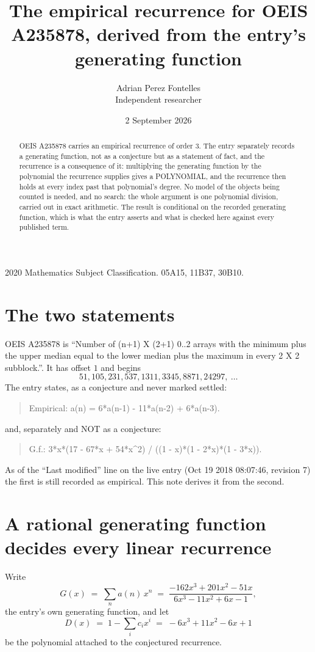 \documentclass[11pt,a4paper]{article}
\title{The empirical recurrence for OEIS A235878, derived from the entry's generating function}
\author{Adrian Perez Fontelles\\ \small Independent researcher}
\date{2 September 2026}
\theoremstyle{plain}
\theoremstyle{definition}
\begin{document}
\maketitle

\begin{abstract}
OEIS A235878 carries an empirical recurrence of order $3$. The entry separately records a
generating function, not as a conjecture but as a statement of fact, and the recurrence is a
consequence of it: multiplying the generating function by the polynomial the recurrence
supplies gives a POLYNOMIAL, and the recurrence then holds at every index past that
polynomial's degree. No model of the objects being counted is needed, and no search: the
whole argument is one polynomial division, carried out in exact arithmetic. The result is
conditional on the recorded generating function, which is what the entry asserts and what is
checked here against every published term.
\end{abstract}

\noindent\small 2020 Mathematics Subject Classification. 05A15, 11B37, 30B10.\normalsize

\section{The two statements}

OEIS A235878 is ``Number of (n+1) X (2+1) 0..2 arrays with the minimum plus the upper median equal to the lower median plus the maximum in every 2 X 2 subblock.''. It has offset $1$ and begins
\[
51, 105, 231, 537, 1311, 3345, 8871, 24297,\ \dots
\]
The entry states, as a conjecture and never marked settled:
\begin{quote}
Empirical: a(n) = 6*a(n-1) - 11*a(n-2) + 6*a(n-3).
\end{quote}
and, separately and NOT as a conjecture:
\begin{quote}
G.f.: 3*x*(17 - 67*x + 54*x\^{}2) / ((1 - x)*(1 - 2*x)*(1 - 3*x)).
\end{quote}
As of the ``Last modified'' line on the live entry (Oct 19 2018 08:07:46, revision 7) the first is still
recorded as empirical. This note derives it from the second.

\section{A rational generating function decides every linear recurrence}

Write
\[
G(x)\;=\;\sum_{n}a(n)\,x^{n}\;=\;\frac{- 162 x^{3} + 201 x^{2} - 51 x}{6 x^{3} - 11 x^{2} + 6 x - 1},
\]
the entry's own generating function, and let
\[
D(x)\;=\;1-\sum_i c_i x^{i}\;=\;- 6 x^{3} + 11 x^{2} - 6 x + 1
\]
be the polynomial attached to the conjectured recurrence.
\end{document}
